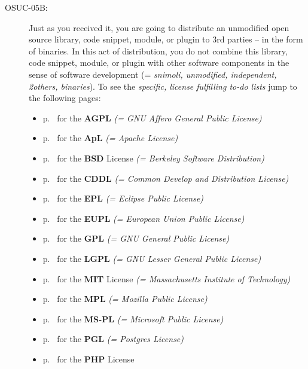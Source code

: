 \begin{description}
\item[OSUC-05B:]\label{OSUC-05B-DEF} Just as you received it, you are going to
distribute an unmodified open source library, code snippet, module, or plugin to
3rd parties -- in the form of binaries. In this act of distribution, you do not
combine this library, code snippet, module, or plugin with other software
components in the sense of software development (= \textit{snimoli, unmodified,
independent, 2others, binaries}). To see the \textit{specific, license
fulfilling to-do lists} jump to the following pages:
  \begin{itemize}
    \item p.\ \pageref{OSUC-05B-AGPL} for the \textbf{AGPL}
      \textit{(= GNU Affero General Public License)} 
    \item p.\ \pageref{OSUC-05B-Apache20} for the \textbf{ApL}
      \textit{(= Apache License)}
    \item p.\ \pageref{OSUC-05B-BSD} for the \textbf{BSD} License
      \textit{(= Berkeley Software Distribution)}
    \item p.\ \pageref{OSUC-05B-CDDL} for the \textbf{CDDL}
      \textit{(= Common Develop and Distribution License)}  
    \item p.\ \pageref{OSUC-05B-EPL} for the \textbf{EPL}
      \textit{(= Eclipse Public License)}     
    \item p.\ \pageref{OSUC-05B-EUPL} for the \textbf{EUPL}
      \textit{(= European Union Public License)} 
    \item p.\ \pageref{OSUC-05B-GPL} for the \textbf{GPL}
       \textit{(= GNU General Public License)} 
    \item p.\ \pageref{OSUC-05B-LGPL} for the \textbf{LGPL}
      \textit{(= GNU Lesser General Public License)}           
    \item p.\ \pageref{OSUC-05B-MIT} for the \textbf{MIT} License
       \textit{(= Massachusetts Institute of Technology)} 
    \item p.\ \pageref{OSUC-05B-MPL} for the \textbf{MPL}
      \textit{(= Mozilla Public License)}     
    \item p.\ \pageref{OSUC-05B-MS-PL} for the \textbf{MS-PL}
      \textit{(= Microsoft Public License)} 
    \item p.\ \pageref{OSUC-05B-PGL} for the \textbf{PGL}
      \textit{(= Postgres License)} 
    \item p.\ \pageref{OSUC-05B-PHP} for the \textbf{PHP} License 
  \end{itemize}



\end{description}
